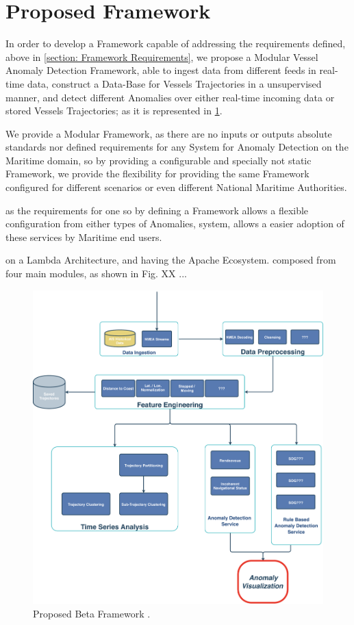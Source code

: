 

\section{Proposed Framework}
In order to develop a Framework capable of addressing the requirements defined, above in \ref{section: Framework Requirements}, we propose a Modular Vessel Anomaly Detection Framework, able to ingest data from different feeds in real-time data, construct a Data-Base for Vessels Trajectories in a unsupervised manner, and detect different Anomalies over either real-time incoming data or stored Vessels Trajectories; as it is represented in \ref{fig:Framework}.

We provide a Modular Framework, as there are no inputs or outputs absolute standards nor defined requirements for any System for Anomaly Detection on the Maritime domain, so by providing a configurable and specially not static Framework, we provide the flexibility for providing the same Framework configured for different scenarios or even different National Maritime Authorities.

as the requirements for one so by defining a Framework allows a flexible configuration from either types of Anomalies, system, allows a easier adoption of these services by Maritime end users. 

on a Lambda Architecture, and having the Apache Ecosystem. composed from four main modules, as shown in Fig. XX ...

\begin{figure}[H]
	\centering
	\includegraphics[scale = .37]{figures/Ch3/Framework.pdf}
    \caption{Proposed Beta Framework .}
    \label{fig:Framework}
\end{figure}

